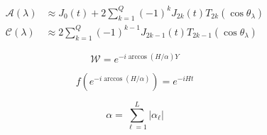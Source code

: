 \documentclass[11pt, oneside]{article}   	%
\begin{document}
\begin{align*} 
\mathcal{A}(\lambda)
&\approx J_0(t) + 2 \sum^{Q}_{k=1} (-1)^{k} J_{2k}(t) T_{2k}(\cos \theta_{\lambda}) \\
\mathcal{C}(\lambda)
&\approx 2 \sum^{Q}_{k=1} (-1)^{k-1} J_{2k-1}(t) T_{2k-1}(\cos \theta_{\lambda})
\end{align*}

\begin{equation*}
\mathcal{W} = e^{-i \arccos (H/\alpha) Y}
\end{equation*}

\begin{equation*}
f (e^{-i \arccos (H/\alpha)}) = e^{-i H t}
\end{equation*}

\begin{equation*}
\alpha = \sum^L_{\ell=1} | \alpha_{\ell} |
\end{equation*}




\end{document}
